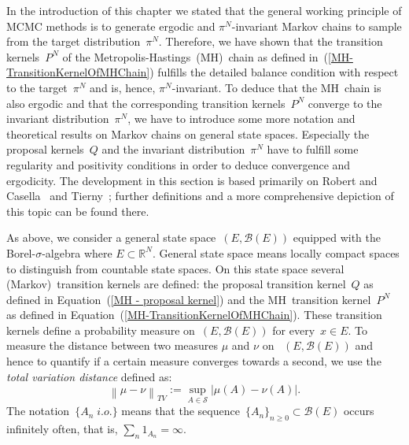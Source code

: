 In the introduction of this chapter we stated that the general working principle of MCMC methods is to generate ergodic and $\pi^{N}$-invariant Markov chains to sample from the target distribution~$\pi^{N}$. Therefore, we have shown that the transition kernels~$P^{N}$ of the Metropolis-Hastings~(MH)~chain as defined in~(\ref{MH-TransitionKernelOfMHChain}) fulfills the detailed balance condition with respect to the target~$\pi^{N}$ and is, hence, $\pi^{N}$-invariant. To deduce that the MH~chain is also ergodic and that the corresponding transition kernels~$P^{N}$ converge to the invariant distribution~$\pi^{N}$, we have to introduce some more notation and theoretical results on Markov chains on general state spaces. Especially the proposal kernels~$Q$ and the invariant distribution~$\pi^{N}$ have to fulfill some regularity and positivity conditions in order to deduce convergence and ergodicity. The development in this section is based primarily on Robert and Casella~\autocite[Chapter~6 and~7]{Robert2005} and Tierny~\autocite{Tierny1994}; further definitions and a more comprehensive depiction of this topic can be found there.


As above, we consider a general state space~$ \left( E, \mathcal{B}(E) \right) $ equipped with the Borel-$\sigma$-algebra where $ E \subset \mathbb{R}^{N} $. General state space means locally compact spaces to distinguish from countable state spaces. On this state space several (Markov)~transition kernels are defined: the proposal transition kernel~$Q$ as defined in Equation~(\ref{MH - proposal kernel}) and the MH~transition kernel~$P^{N}$ as defined in Equation~(\ref{MH-TransitionKernelOfMHChain}). These transition kernels define a probability measure on~$ \left( E, \mathcal{B}(E) \right) $ for every~$ x \in E $. To measure the distance between two measures $\mu$ and $\nu$ on ~$ \left( E, \mathcal{B}(E) \right) $  and hence to quantify if a certain measure converges towards a second, we use the \textit{total variation distance} defined as:
 \begin{equation}
  \left\| \mu - \nu \right\|_{TV} := \sup_{A \in \mathcal{S}} \left| \mu(A) - \nu(A) \right|.
 \end{equation}
The notation~$\{ A_n \; i.o. \}$ means that the sequence~$ \{A_n\}_{n \geq 0} \subset \mathcal{B}(E) $ occurs infinitely often, that is, $ \sum_n 1_{A_n} = \infty $.

